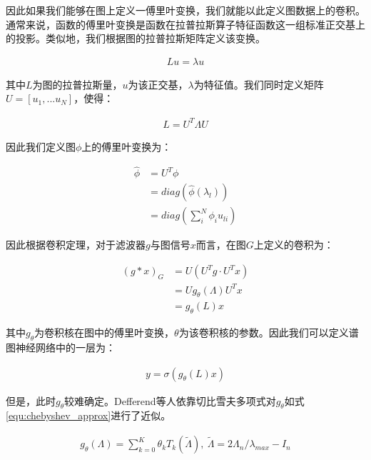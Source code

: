 因此如果我们能够在图上定义一傅里叶变换，我们就能以此定义图数据上的卷积。通常来说，函数的傅里叶变换是函数在拉普拉斯算子特征函数这一组标准正交基上的投影。类似地，我们根据图的拉普拉斯矩阵定义该变换。

\begin{equation}\begin{aligned}
Lu=\lambda u
\end{aligned}\end{equation}

其中$L$为图的拉普拉斯量，$u$为该正交基，$\lambda$为特征值。我们同时定义矩阵$U=[u_1,...u_N]$，使得：

\begin{equation}\begin{aligned}
L=U^T\Lambda U
\end{aligned}\end{equation}

因此我们定义图$\phi$上的傅里叶变换为：

\begin{equation}\begin{aligned}
\hat \phi &=U^T\phi \\
&=diag(\hat \phi(\lambda_l))\\
&=diag(\sum_i^N\phi_iu_{li})
\end{aligned}\end{equation}

因此根据卷积定理，对于滤波器$g$与图信号$x$而言，在图$G$上定义的卷积为：

\begin{equation}\begin{aligned}
(g*x)_{G}&=U(U^Tg\cdot U^Tx)\\
&=Ug_\theta(\Lambda) U^Tx\\
&=g_\theta(L)x
\end{aligned}\end{equation}

其中$g_\theta$为卷积核在图中的傅里叶变换，$\theta$为该卷积核的参数。因此我们可以定义谱图神经网络中的一层为：

\begin{equation}\begin{aligned}
y=\sigma(g_\theta(L)x)
\end{aligned}\end{equation}

但是，此时$g_\theta$较难确定。Defferend\cite{defferrard_convolutional_2017}等人依靠切比雪夫多项式对$g_\theta$如式\ref{equ:chebyshev_approx}进行了近似。

\begin{equation}\label{equ:chebyshev_approx}
\begin{aligned}
g_{\theta}(\Lambda)=\sum_{k=0}^{K}\theta_kT_k(\tilde{\Lambda}),\ \tilde{\Lambda}=2\Lambda_n/\lambda_{max}-I_n
\end{aligned}\end{equation}

